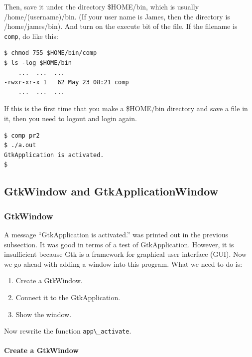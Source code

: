 Then, save it under the directory \$HOME/bin, which is usually
/home/(username)/bin. (If your user name is James, then the directory is
/home/james/bin). And turn on the execute bit of the file. If the
filename is \passthrough{\lstinline!comp!}, do like this:

\begin{lstlisting}
$ chmod 755 $HOME/bin/comp
$ ls -log $HOME/bin
    ...  ...  ...
-rwxr-xr-x 1   62 May 23 08:21 comp
    ...  ...  ...
\end{lstlisting}

If this is the first time that you make a \$HOME/bin directory and save
a file in it, then you need to logout and login again.

\begin{lstlisting}
$ comp pr2
$ ./a.out
GtkApplication is activated.
$
\end{lstlisting}

\subsection{GtkWindow and
GtkApplicationWindow}\label{gtkwindow-and-gtkapplicationwindow}

\subsubsection{GtkWindow}\label{gtkwindow}

A message ``GtkApplication is activated.'' was printed out in the
previous subsection. It was good in terms of a test of GtkApplication.
However, it is insufficient because Gtk is a framework for graphical
user interface (GUI). Now we go ahead with adding a window into this
program. What we need to do is:

\begin{enumerate}
\def\labelenumi{\arabic{enumi}.}
\tightlist
\item
  Create a GtkWindow.
\item
  Connect it to the GtkApplication.
\item
  Show the window.
\end{enumerate}

Now rewrite the function \passthrough{\lstinline!app\_activate!}.

\paragraph{Create a GtkWindow}\label{create-a-gtkwindow}

